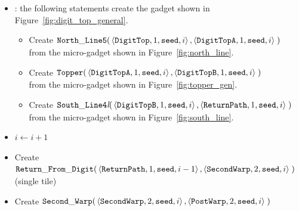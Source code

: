 \begin{itemize}
    \item {\dtop}: the following statements create the gadget shown in Figure~\ref{fig:digit_top_general}.
    \begin{itemize}
        \item Create
        $\begin{aligned}[t]
            {\tt North\_Line5}(& \left \langle {\tt DigitTop},  1, {\tt seed}, i \right\rangle,
                                 \left \langle {\tt DigitTopA}, 1, {\tt seed}, i \right\rangle \;)
        \end{aligned}$\\ from the micro-gadget shown in Figure~\ref{fig:north_line}.

        \item Create
        $\begin{aligned}[t]
            {\tt Topper}(& \left\langle {\tt DigitTopA}, 1, {\tt seed}, i \right\rangle,
                           \left\langle {\tt DigitTopB}, 1, {\tt seed}, i \right\rangle \;)
        \end{aligned}$\\ from the micro-gadget shown in Figure~\ref{fig:topper_gen}.

        \item Create
        $\begin{aligned}[t]
            {\tt South\_Line4\textit{l}}(& \left\langle {\tt DigitTopB}, 1, {\tt seed}, i\right\rangle,
                                           \left\langle {\tt ReturnPath},     1, {\tt seed}, i\right\rangle \;)
        \end{aligned}$\\ from the micro-gadget shown in Figure~\ref{fig:south_line}.
    \end{itemize}

    \item $i \gets i + 1$

    \item Create
    $\begin{aligned}[t]
            {\tt Return\_From\_Digit}(&\left\langle {\tt ReturnPath},      1, {\tt seed}, i - 1\right\rangle,
                              \left\langle {\tt SecondWarp}, 2, {\tt seed}, i    \right\rangle \;)
    \end{aligned}$\\ (single tile)

    \item Create
    $\begin{aligned}[t]
        {\tt Second\_Warp}(&\left\langle {\tt SecondWarp}, 2, {\tt seed}, i \right\rangle,
                     \left\langle {\tt PostWarp},   2, {\tt seed}, i \right\rangle \;)
    \end{aligned}$


\end{itemize}
